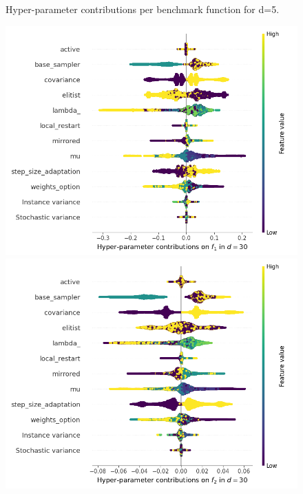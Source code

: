 \begin{figure}[t]
\caption{Hyper-parameter contributions per benchmark function for d=5. \label{fig:shapxplaind5}}

\end{figure}

\begin{figure}[t]
\centering
	\includegraphics[height=0.15\textheight,trim=0mm 0mm 30mm 0mm,clip]{cma_img_new/img_summary_f1_d30.png}
	\includegraphics[height=0.15\textheight,trim=60mm 0mm 30mm 0mm,clip]{cma_img_new/img_summary_f2_d30.png}

\end{figure}
